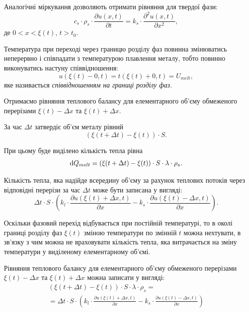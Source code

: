 Аналогічні міркування дозволяють отримати рівняння для твердої фази:
\begin{equation}
	c_s \cdot \rho_s \cdot \frac{\partial u(x, t)}{\partial t} = k_s \cdot \frac{\partial^2 u(x, t)}{\partial x^2},
\end{equation}
де $0 < x < \xi(t)$, $t > t_0$. \medskip

\begin{definition}
	Температура при переході через границю розділу фаз повинна змінюватись неперервно і співпадати з температурою плавлення металу, тобто повинно виконуватись настуну співвідношення:
	\begin{equation}
		u(\xi(t) - 0, t) = t(\xi(t) + 0, t) = U_{melt},
	\end{equation}
	яке називається \it{співвідношенням на границі розділу фаз}.
\end{definition}

Отримаємо рівняння теплового балансу для елементарного об'єму обмеженого перерізами $\xi(t) - \Delta x$ та  $\xi(t) + \Delta x$. \medskip

За час $\Delta t$ затвердіє об'єм металу рівний
\begin{equation}
	(\xi(t + \Delta t) - \xi(t)) \cdot S.
\end{equation}

При цьому буде виділено кількість тепла рівна
\begin{equation}
	\mathop{}\!\mathrm{d} Q_{melt} = (\xi(t + \Delta t) - \xi(t)) \cdot S \cdot \lambda \cdot \rho_s.
\end{equation}

Кількість тепла, яка надійде всередину об'єму за рахунок теплових потоків через відповідні перерізи за час $\Delta t$ може бути записана у вигляді:
\begin{equation}
	\Delta t \cdot S \cdot \left( k_l \cdot \frac{\partial u(\xi(t) + \Delta x, t)}{\partial x} - k_s \cdot \frac{\partial u(\xi(t) - \Delta x, t)}{\partial x}\right).
\end{equation}
 
Оскільки фазовий перехід відбувається при постійній температурі, то в околі границі розділу фаз $\xi(t)$ зміною температури по змінній $t$ можна нехтувати, в зв'язку з чим можна не враховувати кількість тепла, яка витрачається на зміну температури у виділеному елементарному об'ємі. \medskip

Рівняння теплового балансу для елементарного об'єму обмеженого перерізами $\xi(t) - \Delta x$ та $\xi(t) + \Delta x$ можна записати у вигляді:
\begin{multline}
	(\xi(t + \Delta t) - \xi(t)) \cdot S \cdot \lambda \cdot \rho_s = \\
	= \Delta t \cdot S \cdot \left( k_l \cdot \frac{\partial u(\xi(t) + \Delta x, t)}{\partial x} - k_s \cdot \frac{\partial u(\xi(t) - \Delta x, t)}{\partial x}\right)
\end{multline}

